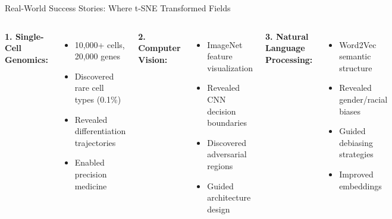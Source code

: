 \documentclass[aspectratio=169]{beamer}
\begin{document}
\begin{frame}{Real-World Success Stories: Where t-SNE Transformed Fields}
\begin{columns}
\textbf{1. Single-Cell Genomics:}
\begin{itemize}
\item 10,000+ cells, 20,000 genes
\item Discovered rare cell types (0.1\%)
\item Revealed differentiation trajectories
\item Enabled precision medicine
\end{itemize}

\textbf{2. Computer Vision:}
\begin{itemize}
\item ImageNet feature visualization
\item Revealed CNN decision boundaries
\item Discovered adversarial regions
\item Guided architecture design
\end{itemize}

\textbf{3. Natural Language Processing:}
\begin{itemize}
\item Word2Vec semantic structure
\item Revealed gender/racial biases
\item Guided debiasing strategies
\item Improved embeddings
\end{itemize}

\end{columns}
\end{frame}
\end{document}
